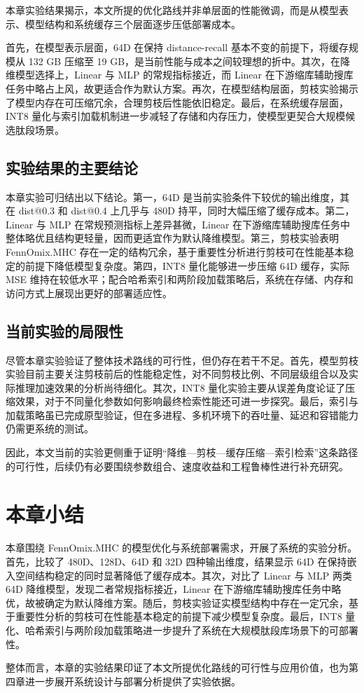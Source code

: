 本章实验结果揭示，本文所提的优化路线并非单层面的性能微调，而是从模型表示、模型结构和系统缓存三个层面逐步压低部署成本。

首先，在模型表示层面，64D 在保持 distance-recall 基本不变的前提下，将缓存规模从 132 GB 压缩至 19 GB，是当前性能与成本之间较理想的折中。其次，在降维模型选择上，Linear 与 MLP 的常规指标接近，而 Linear 在下游缩库辅助搜库任务中略占上风，故更适合作为默认方案。再次，在模型结构层面，剪枝实验揭示了模型内存在可压缩冗余，合理剪枝后性能依旧稳定。最后，在系统缓存层面，INT8 量化与索引加载机制进一步减轻了存储和内存压力，使模型更契合大规模候选肽段场景。

\subsection{实验结果的主要结论}

本章实验可归结出以下结论。第一，64D 是当前实验条件下较优的输出维度，其在 dist@0.3 和 dist@0.4 上几乎与 480D 持平，同时大幅压缩了缓存成本。第二，Linear 与 MLP 在常规预测指标上差异甚微，Linear 在下游缩库辅助搜库任务中整体略优且结构更轻量，因而更适宜作为默认降维模型。第三，剪枝实验表明 FennOmix.MHC 存在一定的结构冗余，基于重要性分析进行剪枝可在性能基本稳定的前提下降低模型复杂度。第四，INT8 量化能够进一步压缩 64D 缓存，实际 MSE 维持在较低水平；配合哈希索引和两阶段加载策略后，系统在存储、内存和访问方式上展现出更好的部署适应性。

\subsection{当前实验的局限性}

尽管本章实验验证了整体技术路线的可行性，但仍存在若干不足。首先，模型剪枝实验目前主要关注剪枝前后的性能稳定性，对不同剪枝比例、不同层级组合以及实际推理加速效果的分析尚待细化。其次，INT8 量化实验主要从误差角度论证了压缩效果，对于不同量化参数如何影响最终检索性能还可进一步探究。最后，索引与加载策略虽已完成原型验证，但在多进程、多机环境下的吞吐量、延迟和容错能力仍需更系统的测试。

因此，本文当前的实验更侧重于证明“降维—剪枝—缓存压缩—索引检索”这条路径的可行性，后续仍有必要围绕参数组合、速度收益和工程鲁棒性进行补充研究。

\section{本章小结}

本章围绕 FennOmix.MHC 的模型优化与系统部署需求，开展了系统的实验分析。首先，比较了 480D、128D、64D 和 32D 四种输出维度，结果显示 64D 在保持嵌入空间结构稳定的同时显著降低了缓存成本。其次，对比了 Linear 与 MLP 两类 64D 降维模型，发现二者常规指标接近，Linear 在下游缩库辅助搜库任务中略优，故被确定为默认降维方案。随后，剪枝实验证实模型结构中存在一定冗余，基于重要性分析的剪枝可在性能基本稳定的前提下减少模型复杂度。最后，INT8 量化、哈希索引与两阶段加载策略进一步提升了系统在大规模肽段库场景下的可部署性。

整体而言，本章的实验结果印证了本文所提优化路线的可行性与应用价值，也为第四章进一步展开系统设计与部署分析提供了实验依据。